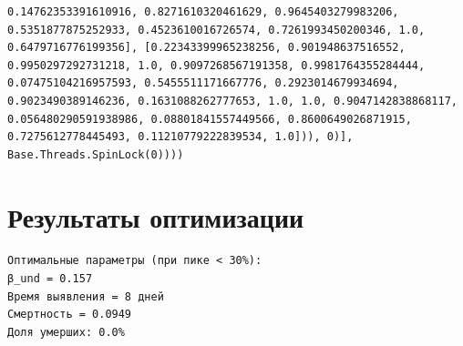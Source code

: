 \documentclass[
  12pt,
  a4paper,
  DIV=11,
  numbers=noendperiod]{scrreprt}
\newenvironment{Shaded}{\begin{snugshade}}{\end{snugshade}}
\newcommand{\DataTypeTok}[1]{\textcolor[rgb]{0.68,0.00,0.00}{#1}}
\newcommand{\FloatTok}[1]{\textcolor[rgb]{0.68,0.00,0.00}{#1}}
\newcommand{\FunctionTok}[1]{\textcolor[rgb]{0.28,0.35,0.67}{#1}}
\newcommand{\NormalTok}[1]{\textcolor[rgb]{0.00,0.23,0.31}{#1}}
\newcommand{\OperatorTok}[1]{\textcolor[rgb]{0.37,0.37,0.37}{#1}}
\newcommand{\SpecialCharTok}[1]{\textcolor[rgb]{0.37,0.37,0.37}{#1}}
\newcommand{\StringTok}[1]{\textcolor[rgb]{0.13,0.47,0.30}{#1}}
\begin{document}
\begin{verbatim}
0.14762353391610916, 0.8271610320461629, 0.9645403279983206, 0.5351877875252933, 0.4523610016726574, 0.7261993450200346, 1.0, 0.6479716776199356], [0.22343399965238256, 0.901948637516552, 0.9950297292731218, 1.0, 0.9097268567191358, 0.9981764355284444, 0.07475104216957593, 0.5455511171667776, 0.2923014679934694, 0.9023490389146236, 0.1631088262777653, 1.0, 1.0, 0.9047142838868117, 0.056480290591938986, 0.08801841557449566, 0.8600649026871915, 0.7275612778445493, 0.11210779222839534, 1.0])), 0)], Base.Threads.SpinLock(0))))
\end{verbatim}

\section{Результаты
оптимизации}\label{ux440ux435ux437ux443ux43bux44cux442ux430ux442ux44b-ux43eux43fux442ux438ux43cux438ux437ux430ux446ux438ux438}

\begin{Shaded}
\end{Shaded}

\begin{verbatim}
Оптимальные параметры (при пике < 30%):
β_und = 0.157
Время выявления = 8 дней
Смертность = 0.0949
Доля умерших: 0.0%
\end{verbatim}
\end{document}
